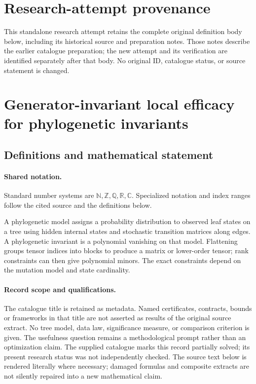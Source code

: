 \documentclass[11pt]{article}
\begin{document}
\section*{Research-attempt provenance}
This standalone research attempt retains the complete original definition body below,
including its historical source and preparation notes. Those notes describe the
earlier catalogue preparation; the new attempt and its verification are identified
separately after that body. No original ID, catalogue status, or source statement is changed.

\section{Generator-invariant local efficacy for phylogenetic invariants}\label{statement}

\subsection{Definitions and mathematical statement}

\paragraph{Shared notation.}Standard number systems are $\mathbb N,\mathbb Z,\mathbb Q,\mathbb R,\mathbb C$. Specialized notation and index ranges follow the cited source and the definitions below.


A phylogenetic model assigns a probability distribution to observed leaf states on a tree using hidden internal states and stochastic transition matrices along edges. A phylogenetic invariant is a polynomial vanishing on that model. Flattening groups tensor indices into blocks to produce a matrix or lower-order tensor; rank constraints can then give polynomial minors. The exact constraints depend on the mutation model and state cardinality.
\paragraph{Record scope and qualifications.}
The catalogue title is retained as metadata. Named certificates, contracts, bounds or frameworks in that title are not asserted as results of the original source extract.
No tree model, data law, significance measure, or comparison criterion is given. The usefulness question remains a methodological prompt rather than an optimization claim. The supplied catalogue marks this record partially solved; its present research status was not independently checked.
The source text below is rendered literally where necessary; damaged formulas and composite extracts are not silently repaired into a new mathematical claim.
\end{document}
